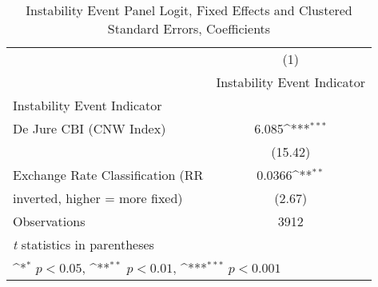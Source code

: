 \begin{table}[htbp]\centering
\def\sym#1{\ifmmode^{#1}\else\(^{#1}\)\fi}
\caption{Instability Event Panel Logit, Fixed Effects and Clustered Standard Errors, Coefficients \label{coeffsJustBinInstabEventDJ}}
\begin{tabular}{l*{1}{c}}
\toprule
                                        &\multicolumn{1}{c}{(1)}\\
                                        &\multicolumn{1}{c}{Instability Event Indicator}\\
\midrule
Instability Event Indicator             &                  \\
De Jure CBI (CNW Index)                 &    6.085\sym{***}\\
                                        &  (15.42)         \\
\addlinespace
Exchange Rate Classification (RR        &   0.0366\sym{**} \\
inverted, higher = more fixed)          &   (2.67)         \\
\midrule
Observations                            &     3912         \\
\bottomrule
\multicolumn{2}{l}{\footnotesize \textit{t} statistics in parentheses}\\
\multicolumn{2}{l}{\footnotesize \sym{*} \(p<0.05\), \sym{**} \(p<0.01\), \sym{***} \(p<0.001\)}\\
\end{tabular}
\end{table}
